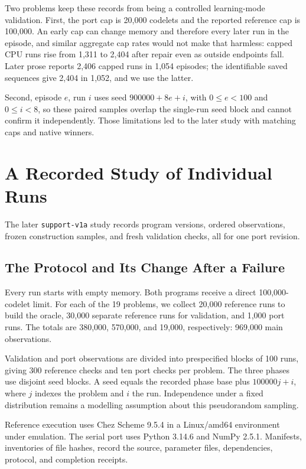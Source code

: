 \documentclass[10pt,letterpaper]{article}
\begin{document}
Two problems keep these records from being a controlled learning-mode validation. First,
the port cap is 20,000 codelets and the reported reference cap is 100,000. An early cap
can change memory and therefore every later run in the episode, and similar aggregate cap
rates would not make that harmless: capped CPU runs rise from 1,311 to 2,404 after repair
even as outside endpoints fall. Later prose reports 2,406 capped runs in 1,054 episodes;
the identifiable saved sequences give 2,404 in 1,052, and we use the latter.

Second, episode \(e\), run \(i\) uses seed \(900000+8e+i\), with \(0\le e<100\) and
\(0\le i<8\), so these paired samples overlap the single-run seed block and cannot confirm
it independently. Those limitations led to the later study with matching caps and native
winners.

\section{A Recorded Study of Individual Runs}\label{sec:single-study}

The later \texttt{support-v1a} study records program versions, ordered observations,
frozen construction samples, and fresh validation checks, all for one port revision.

\subsection{The Protocol and Its Change After a Failure}\label{sec:single-protocol}

Every run starts with empty memory. Both programs receive a direct 100,000-codelet limit.
For each of the 19 problems, we collect 20,000 reference runs to build the oracle, 30,000
separate reference runs for validation, and 1,000 port runs. The totals are 380,000,
570,000, and 19,000, respectively: 969,000 main observations.

Validation and port observations are divided into prespecified blocks of 100 runs, giving
300 reference checks and ten port checks per problem. The three phases use disjoint seed
blocks. A seed equals the recorded phase base plus \(100000j+i\), where \(j\) indexes the
problem and \(i\) the run. Independence under a fixed distribution remains a modelling
assumption about this pseudorandom sampling.

Reference execution uses Chez Scheme 9.5.4 in a Linux/amd64 environment under emulation.
The serial port uses Python 3.14.6 and NumPy 2.5.1. Manifests, inventories of file hashes,
record the source, parameter files, dependencies, protocol, and completion receipts.
\end{document}
